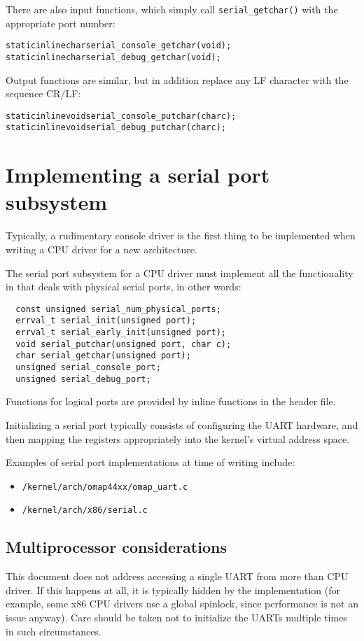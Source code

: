 \documentclass[a4paper,twoside]{report} %
\begin{document}
There are also input functions, which simply call
\texttt{serial\_getchar()} with the appropriate port number:
\begin{alltt}
  static inline char serial\_console\_getchar(void);
  static inline char serial\_debug\_getchar(void);
\end{alltt}

Output functions are similar, but in addition replace any LF character
with the sequence CR/LF:
\begin{alltt}
  static inline void serial\_console\_putchar(char c);
  static inline void serial\_debug\_putchar(char c);
\end{alltt}

\section{Implementing a serial port subsystem}

Typically, a rudimentary console driver is the first thing to be
implemented when writing a CPU driver for a new architecture.   

The serial port subsystem for a CPU driver must implement all the
functionality in \Intf that deals with physical serial ports, in other
words:
\begin{verbatim}
  const unsigned serial_num_physical_ports;
  errval_t serial_init(unsigned port);
  errval_t serial_early_init(unsigned port);
  void serial_putchar(unsigned port, char c);
  char serial_getchar(unsigned port);
  unsigned serial_console_port;  
  unsigned serial_debug_port;
\end{verbatim}

Functions for logical ports are provided by inline functions in the
header file. 

Initializing a serial port typically consists of configuring the UART
hardware, and then mapping the registers appropriately into the
kernel's virtual address space. 

Examples of serial port implementations at time of writing include:
\begin{itemize}
\item \texttt{/kernel/arch/omap44xx/omap\_uart.c}
\item \texttt{/kernel/arch/x86/serial.c}
\end{itemize}

\subsection{Multiprocessor considerations}

This document does not address accessing a single UART from more than
CPU driver.  If this happens at all, it is typically hidden by the
implementation (for example, some x86 CPU drivers use a global
spinlock, since performance is not an issue anyway).  Care should be
taken not to initialize the UARTs multiple times in such
circumstances. 
\end{document}
